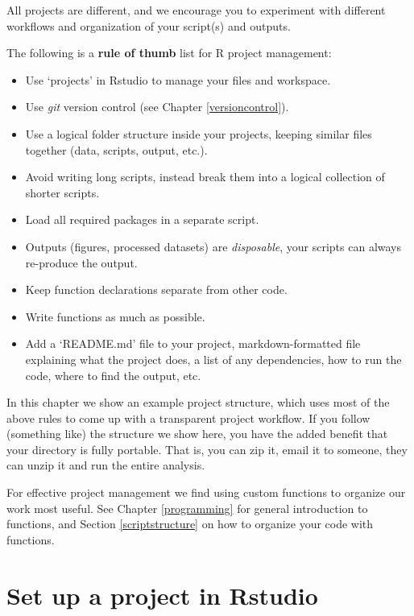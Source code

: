 \documentclass[]{book}
\providecommand{\tightlist}{%
  \setlength{\itemsep}{0pt}\setlength{\parskip}{0pt}}
\begin{document}
All projects are different, and we encourage you to experiment with different workflows and organization of your script(s) and outputs.

The following is a \textbf{rule of thumb} list for R project management:

\begin{itemize}
\tightlist
\item
  Use `projects' in Rstudio to manage your files and workspace.
\item
  Use \emph{git} version control (see Chapter \ref{versioncontrol}).
\item
  Use a logical folder structure inside your projects, keeping similar files together (data, scripts, output, etc.).
\item
  Avoid writing long scripts, instead break them into a logical collection of shorter scripts.
\item
  Load all required packages in a separate script.
\item
  Outputs (figures, processed datasets) are \emph{disposable}, your scripts can always re-produce the output.
\item
  Keep function declarations separate from other code.
\item
  Write functions as much as possible.
\item
  Add a `README.md' file to your project, markdown-formatted file explaining what the project does, a list of any dependencies, how to run the code, where to find the output, etc.
\end{itemize}

In this chapter we show an example project structure, which uses most of the above rules to come up with a transparent project workflow. If you follow (something like) the structure we show here, you have the added benefit that your directory is fully portable. That is, you can zip it, email it to someone, they can unzip it and run the entire analysis.

For effective project management we find using custom functions to organize our work most useful. See Chapter \ref{programming} for general introduction to functions, and Section \ref{scriptstructure} on how to organize your code with functions.

\hypertarget{rstudioprojects}{%
\section{Set up a project in Rstudio}\label{rstudioprojects}}
\end{document}
